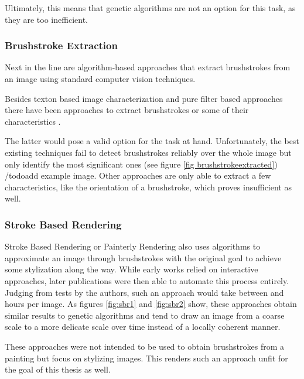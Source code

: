 Ultimately, this means that genetic algorithms are not an option for this task, as they are too inefficient.

\subsubsection{Brushstroke Extraction}
Next in the line are algorithm-based approaches that extract brushstrokes from an image using standard computer vision techniques.

Besides texton based image characterization \cite{textons} and pure filter based approaches \cite{filters} there have been approaches to extract brushstrokes or some of their characteristics \cite{brushstrokecharacteristics} \cite{brushstrokeextraction}.

The latter would pose a valid option for the task at hand.
Unfortunately, the best existing techniques fail to detect brushstrokes reliably over the whole image but only identify the most significant ones (see figure \ref{fig brushstrokeextracted}) /todo{add example image}.
Other approaches are only able to extract a few characteristics, like the orientation of a brushstroke, which proves insufficient as well.

\subsubsection{Stroke Based Rendering}
Stroke Based Rendering or Painterly Rendering also uses algorithms to approximate an image through brushstrokes with the original goal to achieve some stylization along the way.
While early works relied on interactive approaches, later publications were then able to automate this process entirely.
Judging from tests by the authors, such an approach would take between  and  hours per image.
As figures \ref{fig:sbr1} and \ref{fig:sbr2} show, these approaches obtain similar results to genetic algorithms and tend to draw an image from a coarse scale to a more delicate scale over time instead of a locally coherent manner.

These approaches were not intended to be used to obtain brushstrokes from a painting but focus on stylizing images.
This renders such an approach unfit for the goal of this thesis as well.

